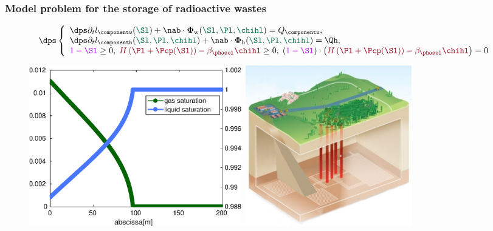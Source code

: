 \documentclass[aspectratio=169]{beamer}
\begin{document}
\subsection{}
\begin{frame}
\frametitle{Model problem for the storage of radioactive wastes }
\vspace*{-0.6 cm}
\begin{equation*}
\dps
\left\lbrace\begin{array}{llccc}
\dps \partial_t l_\componentw(\textcolor{cadmiumgreen}{\Sl}) + \nab \cdot {\bm \Phi}_{\mathrm{w}}(\textcolor{cadmiumgreen}{\Sl,\Pl,\chihl}) = Q_{\componentw}, \\
\dps \partial_t l_\componenth(\textcolor{cadmiumgreen}{\Sl,\Pl,\chihl})  + \nab \cdot {\bm \Phi}_{\mathrm{h}}(\textcolor{cadmiumgreen}{\Sl,\Pl,\chihl})=\Qh,\\
\textcolor{electricpurple}{1 - \Sl} \geq 0, \;  \textcolor{carmine}{H\left(\Pl + \Pcp(\Sl) \right) - \beta_{\phasel} \chihl} \geq 0, \; \left(\textcolor{electricpurple}{1 - \Sl} \right) \cdot \left(\textcolor{carmine}{H\left(\Pl + \Pcp(\Sl) \right) - \beta_{\phasel} \chihl}\right)=0  
\end{array}
\right.
\end{equation*}
\begin{figure}
\includegraphics[width=0.45\textwidth]{fig_article_chap_3/saturations_cv_solver_1000_cells_nt=20} \qquad
\includegraphics[width=0.35\textwidth]{fig_article_chap_3/stockage_dechets_radioactifs_sans_texte}
\end{figure}

\end{frame}
\end{document}

